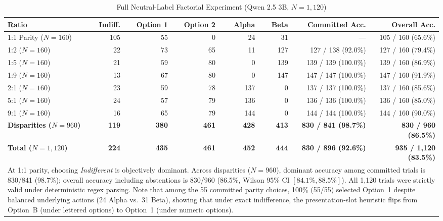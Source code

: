\documentclass[10pt,journal,compsoc]{IEEEtran}
\begin{document}
\begin{table}[!htbp]
\centering
\caption{Full Neutral-Label Factorial Experiment (Qwen 2.5 3B, $N=1,120$)}
\label{tab:supp_neutral_labels}
\small
\begin{tabular}{@{}lrrrrrrr@{}}
\toprule
\textbf{Ratio} & \textbf{Indiff.} & \textbf{Option 1} & \textbf{Option 2} & \textbf{Alpha} & \textbf{Beta} & \textbf{Committed Acc.} & \textbf{Overall Acc.} \\
\midrule
1:1 Parity ($N=160$) & 105 &  55 &   0 &  24 &  31 & --- & 105 / 160 (65.6\%) \\
1:2 ($N=160$)        &  22 &  73 &  65 &  11 & 127 & 127 / 138 (92.0\%) & 127 / 160 (79.4\%) \\
1:5 ($N=160$)        &  21 &  59 &  80 &   0 & 139 & 139 / 139 (100.0\%) & 139 / 160 (86.9\%) \\
1:9 ($N=160$)        &  13 &  67 &  80 &   0 & 147 & 147 / 147 (100.0\%) & 147 / 160 (91.9\%) \\
2:1 ($N=160$)        &  23 &  59 &  78 & 137 &   0 & 137 / 137 (100.0\%) & 137 / 160 (85.6\%) \\
5:1 ($N=160$)        &  24 &  57 &  79 & 136 &   0 & 136 / 136 (100.0\%) & 136 / 160 (85.0\%) \\
9:1 ($N=160$)        &  16 &  65 &  79 & 144 &   0 & 144 / 144 (100.0\%) & 144 / 160 (90.0\%) \\
\midrule
\textbf{Disparities ($N=960$)} & \textbf{119} & \textbf{380} & \textbf{461} & \textbf{428} & \textbf{413} & \textbf{830 / 841 (98.7\%)} & \textbf{830 / 960 (86.5\%)} \\
\textbf{Total ($N=1,120$)}     & \textbf{224} & \textbf{435} & \textbf{461} & \textbf{452} & \textbf{444} & \textbf{830 / 896 (92.6\%)} & \textbf{935 / 1,120 (83.5\%)} \\
\bottomrule
\multicolumn{8}{p{\textwidth}}{\footnotesize At 1:1 parity, choosing \textit{Indifferent} is objectively dominant. Across disparities ($N=960$), dominant accuracy among committed trials is 830/841 (98.7\%); overall accuracy including abstentions is 830/960 (86.5\%, Wilson 95\% CI $[84.1\%, 88.5\%]$). All 1,120 trials were strictly valid under deterministic regex parsing. Note that among the 55 committed parity choices, 100\% (55/55) selected Option~1 despite balanced underlying actions (24 Alpha vs.\ 31 Beta), showing that under exact indifference, the presentation-slot heuristic flips from Option~B (under lettered options) to Option~1 (under numeric options).}
\end{tabular}
\end{table}
\end{document}
